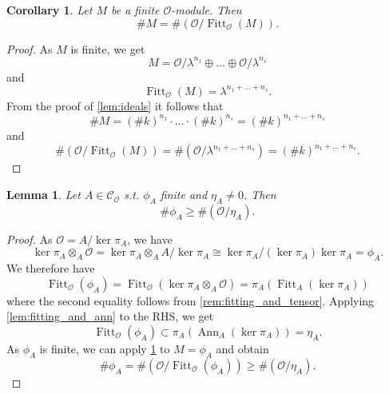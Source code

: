 \documentclass{article}
\theoremstyle{plain}%
\newtheorem{lemma}{Lemma}[section]
\newtheorem{corollary}{Corollary}[section]
\theoremstyle{definition}
\theoremstyle{remark}
\newcommand{\co}{\mathcal{C}_\mathcal{O}}
\newcommand{\ann}{\operatorname{Ann}}
\newcommand{\fitt}{\operatorname{Fitt}}
\begin{document}
\begin{corollary}\label{cor:fitting_finite}
    Let \(M\) be a finite \(\mathcal{O}\)-module. Then
    \[
        \# M = \# (\mathcal{O}/\fitt_\mathcal{O}(M)). 
    \]
\end{corollary}
\begin{proof}
    As \(M\) is finite, we get
    \[
        M = \mathcal{O}/\lambda^{n_1} \oplus \dots \oplus \mathcal{O}/\lambda^{n_s}
    \]
    and 
    \[
        \fitt_\mathcal{O}(M) = \lambda^{n_1 + \dots + n_s}.
    \]
    From the proof of \cref{lem:ideals} it follows that
    \[\# M = (\# k)^{n_1} \cdot \dots \cdot (\# k)^{n_s} = (\# k)^{n_1 + \dots + n_s}\]
    and
    \[
        \# (\mathcal{O}/\fitt_\mathcal{O}(M)) = \# (\mathcal{O}/\lambda^{n_1 + \dots + n_s}) = (\# k)^{n_1 + \dots + n_s}.
    \]
\end{proof}

\begin{lemma}\label{lem:standard_ineq}
    Let \(A \in \co\) s.t. \(\phi_A\) finite and \(\eta_A \neq 0\). Then \[\#\phi_A \geq \#(\mathcal{O}/\eta_A).\]
\end{lemma}
\begin{proof}
    As \(\mathcal{O} = A/\ker \pi_A\), we have
    \[
        \ker \pi_A \otimes_A \mathcal{O} = \ker \pi_A \otimes_A A/\ker \pi_A \cong \ker \pi_A/(\ker \pi_A) \ker \pi_A = \phi_A.
    \]
    We therefore have
    \[
        \fitt_\mathcal{O}(\phi_A) = \fitt_\mathcal{O}(\ker \pi_A \otimes_A\mathcal{O}) = \pi_A(\fitt_A(\ker \pi_A))
    \]
    where the second equality follows from \cref{rem:fitting_and_tensor}.
    Applying \cref{lem:fitting_and_ann} to the RHS, we get 
    \[
        \fitt_\mathcal{O}(\phi_A) \subset \pi_A(\ann_A(\ker \pi_A)) = \eta_A.
    \]
    As \(\phi_A\) is finite, we can apply \cref{cor:fitting_finite} to \(M = \phi_A\) and obtain
    \[
        \# \phi_A = \# (\mathcal{O}/\fitt_\mathcal{O}(\phi_A)) \geq \# (\mathcal{O}/\eta_A).
    \]
\end{proof}
\end{document}
